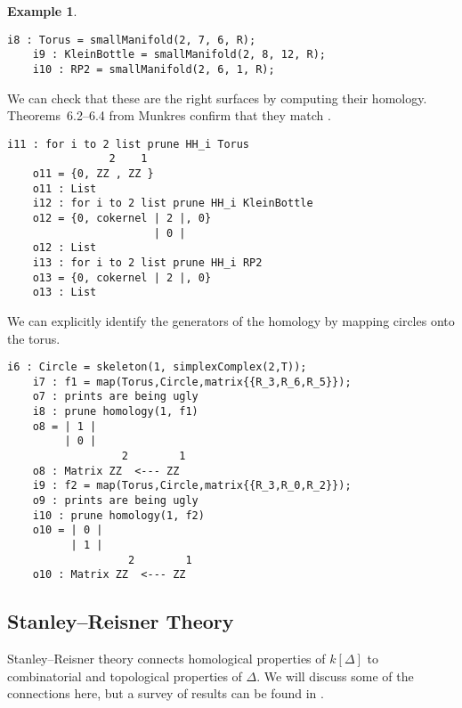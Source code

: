 \documentclass[12pt,leqno]{amsart}
\theoremstyle{definition}
\newtheorem{example}[lemma]{Example}
\begin{document}
\begin{example}
  \label{E: common surfaces and homology}
  $\;$ \\
  
\begin{lstlisting}[basicstyle={\ttfamily \scriptsize}, xleftmargin=-23pt]
    i8 : Torus = smallManifold(2, 7, 6, R);
    i9 : KleinBottle = smallManifold(2, 8, 12, R);
    i10 : RP2 = smallManifold(2, 6, 1, R);
\end{lstlisting}
  We can check that these are the right surfaces by computing their
  homology. Theorems~6.2--6.4 from Munkres confirm that they match
  \cite{Munkres}.
\begin{lstlisting}[basicstyle={\ttfamily \scriptsize}, xleftmargin=-23pt]
    i11 : for i to 2 list prune HH_i Torus
                2    1
    o11 = {0, ZZ , ZZ }
    o11 : List
    i12 : for i to 2 list prune HH_i KleinBottle
    o12 = {0, cokernel | 2 |, 0}
                       | 0 |
    o12 : List
    i13 : for i to 2 list prune HH_i RP2
    o13 = {0, cokernel | 2 |, 0}
    o13 : List
\end{lstlisting}
  We can explicitly identify the generators of the homology by mapping circles
  onto the torus.
\begin{lstlisting}[basicstyle={\ttfamily \scriptsize}, xleftmargin=-23pt]
    i6 : Circle = skeleton(1, simplexComplex(2,T));
    i7 : f1 = map(Torus,Circle,matrix{{R_3,R_6,R_5}});
    o7 : prints are being ugly
    i8 : prune homology(1, f1)
    o8 = | 1 |
         | 0 |
                  2        1
    o8 : Matrix ZZ  <--- ZZ
    i9 : f2 = map(Torus,Circle,matrix{{R_3,R_0,R_2}});
    o9 : prints are being ugly
    i10 : prune homology(1, f2)
    o10 = | 0 |
          | 1 |
                   2        1
    o10 : Matrix ZZ  <--- ZZ
\end{lstlisting}
\end{example}

\addtocounter{section}{1}
\subsection{Stanley--Reisner Theory}
\label{S:Stanley--Reisner Theory}

\noindent
Stanley--Reisner theory connects homological properties of $k[\Delta]$ to
combinatorial and topological properties of $\Delta$. We will discuss some of
the connections here, but a survey of results can be found in
\cites{BH, Stanley, MS}.
\end{document}
